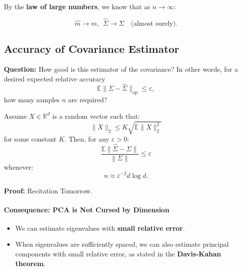 \documentclass{article}
\begin{document}
By the \textbf{law of large numbers}, we know that as \( n \to \infty \):

\[
\hat{m}\to m,\ \ \hat{\Sigma} \to \Sigma \quad \text{(almost surely)}.
\]

\subsection{Accuracy of Covariance Estimator}
\textbf{Question:} How good is this estimator of the covariance? In other words, for a desired expected relative accuracy
\[
\mathbb{E} \|\Sigma - \hat{\Sigma} \|_{\text{op}} \leq \varepsilon,
\]
how many samples \( n \) are required?

\begin{theorem}[Vershynin]
Assume \( X \in \mathbb{R}^d \) is a random vector such that:
\[
\|X\|_2 \leq K \sqrt{\mathbb{E} \|X\|_2^2}
\]
for some constant \( K \). Then, for any \( \varepsilon > 0 \):
\[
\frac{\mathbb{E} \|\hat{\Sigma} - \Sigma\|}{\|\Sigma\|} \leq \varepsilon
\]
whenever:
\[
n \approx \varepsilon^{-2} d \log d.
\]
\end{theorem}

\textbf{Proof:} Recitation Tomorrow.


\paragraph{Consequence: PCA is Not Cursed by Dimension}

\begin{itemize}
    \item We can estimate eigenvalues with \textbf{small relative error}.
    \item When eigenvalues are sufficiently spaced, we can also estimate principal components with small relative error, as stated in the \textbf{Davis-Kahan theorem}.
\end{itemize}
\end{document}
